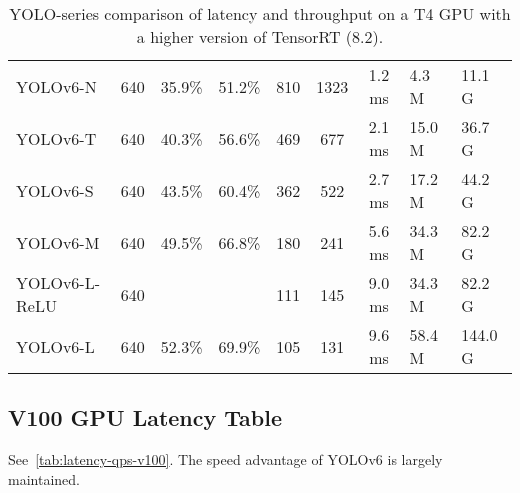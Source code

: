 \documentclass[10pt,twocolumn,letterpaper]{article}
\begin{document}
\begin{table}[ht]
{\begin{tabular}{l|HHHc|c|cHH}
      \midrule
      YOLOv6-N & 640 & 35.9\% & 51.2\% & 810 & 1323 & 1.2 ms &4.3 M & 11.1 G \\
      YOLOv6-T & 640 & 40.3\% & 56.6\% & 469 & 677 & 2.1 ms & 15.0 M & 36.7 G \\
      YOLOv6-S & 640 & 43.5\% & 60.4\% & 362 & 522 & 2.7 ms & 17.2 M & 44.2 G \\
      YOLOv6-M & 640 & 49.5\% & 66.8\%& 180 & 241 & 5.6 ms & 34.3 M & 82.2 G \\
      YOLOv6-L-ReLU & 640 &  & & 111 & 145 & 9.0 ms & 34.3 M & 82.2 G \\
      YOLOv6-L & 640 & 52.3\% & 69.9\% & 105  & 131 & 9.6 ms & 58.4 M & 144.0 G \\
      \bottomrule
		\end{tabular}
	}
	\caption{
    YOLO-series comparison of latency and throughput on a T4 GPU with a higher version of TensorRT (8.2).
	}
	\label{tab:latency-qps-trt82}
\end{table}

\subsection{V100 GPU Latency Table}
See~\cref{tab:latency-qps-v100}. The speed advantage of YOLOv6 is largely maintained.
\end{document}
